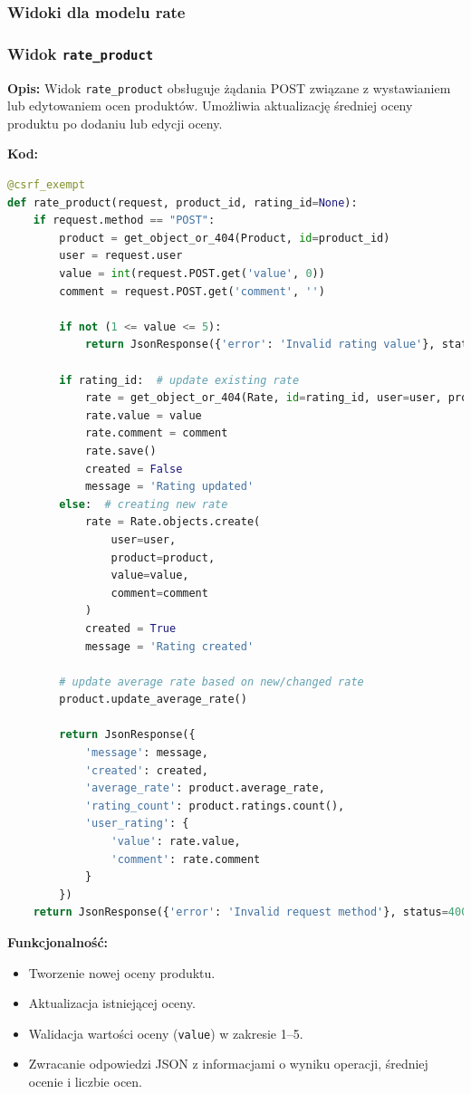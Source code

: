 \documentclass[12pt,a4paper,oneside]{article}
\theoremstyle{definition}
\numberwithin{equation}{section}
\begin{document}
\subsubsection{Widoki dla modelu rate}

\subsubsection{Widok \texttt{rate\_product}}

\textbf{Opis:}  
Widok \texttt{rate\_product} obsługuje żądania POST związane z wystawianiem lub edytowaniem ocen produktów. Umożliwia aktualizację średniej oceny produktu po dodaniu lub edycji oceny.

\textbf{Kod:}
\begin{lstlisting}[language=Python]
@csrf_exempt
def rate_product(request, product_id, rating_id=None):
    if request.method == "POST":
        product = get_object_or_404(Product, id=product_id)
        user = request.user
        value = int(request.POST.get('value', 0))
        comment = request.POST.get('comment', '')

        if not (1 <= value <= 5):
            return JsonResponse({'error': 'Invalid rating value'}, status=400)

        if rating_id:  # update existing rate
            rate = get_object_or_404(Rate, id=rating_id, user=user, product=product)
            rate.value = value
            rate.comment = comment
            rate.save()
            created = False
            message = 'Rating updated'
        else:  # creating new rate
            rate = Rate.objects.create(
                user=user,
                product=product,
                value=value,
                comment=comment
            )
            created = True
            message = 'Rating created'

        # update average rate based on new/changed rate
        product.update_average_rate()

        return JsonResponse({
            'message': message,
            'created': created,
            'average_rate': product.average_rate,
            'rating_count': product.ratings.count(),
            'user_rating': {
                'value': rate.value,
                'comment': rate.comment
            }
        })
    return JsonResponse({'error': 'Invalid request method'}, status=400)
\end{lstlisting}

\textbf{Funkcjonalność:}
\begin{itemize}
    \item Tworzenie nowej oceny produktu.
    \item Aktualizacja istniejącej oceny.
    \item Walidacja wartości oceny (\texttt{value}) w zakresie 1–5.
    \item Zwracanie odpowiedzi JSON z informacjami o wyniku operacji, średniej ocenie i liczbie ocen.
\end{itemize}
\end{document}
